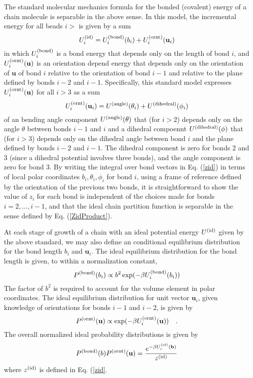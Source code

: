 \documentclass[12pt]{article} %
\newcommand{\vv}[1]{\mathbf{#1}}
\newcommand\Uid{U^{({\rm id})}}
\newcommand\vbond{\vv{b}}
\newcommand\ubond{\vv{u}}
\newcommand\rbond{b}
\newcommand\Ubond{U^{({\rm bond})}}
\newcommand\Uornt{U^{({\rm ornt})}}
\newcommand\Uangle{U^{({\rm angle})}}
\newcommand\Udihedral{U^{({\rm dihedral})}}
\newcommand\Pbond{P^{({\rm bond})}}
\newcommand\Pornt{P^{({\rm ornt})}}
\newcommand\zid{z^{({\rm id})}}
\begin{document}
The standard molecular mechanics formula for the bonded (covalent) energy of a chain molecule is separable in the above sense. In this model, the incremental energy for all beads $i > $ is given by a sum
\begin{equation}
   \Uid_{i} = \Ubond_{i}(\rbond_{i}) + \Uornt_{i}(\ubond_{i})
\end{equation}
in which $\Ubond_{i}$ is a bond energy that depends only on the length of bond $i$, and 
$\Uornt_{i}(\ubond)$ is an orientation depend energy that depends only on the orientation 
of $\ubond$ of bond $i$ relative to the orientation of bond $i-1$ and relative to the plane 
defined by bonds $i-2$ and $i-1$. Specifically, this standard model expresses 
$\Uornt_{i}(\ubond)$ for all $i > 3$ as a sum
\begin{equation}
   \Uornt_{i}(\ubond_{i}) = \Uangle(\theta_{i}) + \Udihedral(\phi_{i}) 
\end{equation}
of an bending angle component $\Uangle(\theta)$ that (for $i>2$) depends only on the angle $\theta$ between bonds $i-1$ and $i$ and a dihedral compoennt $\Udihedral(\phi)$ that (for $i > 3$) depends only on the dihedral angle between bond $i$ and the plane defined by bonds $i-2$ and $i-1$. The dihedral component is zero for bonds $2$ and $3$ (since a dihedral potential involves three bonds), and the angle component is zero for bond $3$. By writing the integral over bond vectors in Eq. (\ref{zid}) in terms of local polar coordinates $b_{i}, \theta_{i}, \phi_{i}$ for bond $i$, using a frame of reference defined by the orientation of the previous two bonds, it is straightforward to show the value of $z_{i}$ for each bond is independent of the choices made for bonds $i=2,\ldots,i-1$, and that the ideal chain partition function is separable in the sense defined by Eq. (\ref{ZidProduct}).

At each stage of growth of a chain with an ideal potential energy $\Uid$ given by the above standard, we may also define an conditional equilibrium distribution for the bond length $\rbond_{i}$ and $\ubond_{i}$. The ideal equilibrium distribution for the bond length is given, to within a normalization constant,
\begin{equation}
    \Pbond(\rbond_{i}) \propto \rbond^{2} \exp( -\beta \Ubond_{i}(\rbond_{i}) )
\end{equation}
The factor of $\rbond^{2}$ is required to account for the volume element in polar coordinates. 
The ideal equilibrium distribution for unit vector $\ubond_{i}$, given knowledge of orientations for bonds $i-1$ and $i-2$, is given by
\begin{equation}
    \Pornt(\ubond) \propto \exp( -\beta \Uornt_{i}(\ubond))
    \quad.
\end{equation}
The overall normalized ideal probability distributions is given by
\begin{equation}
   \Pbond(\rbond)\Pornt(\ubond) = \frac{e^{-\beta\Uid_{i}(\vbond) }} {\zid}
   \label{PtrialNormalized}
\end{equation}
where $\zid$ is defined in Eq. (\ref{zid}.
\end{document}
